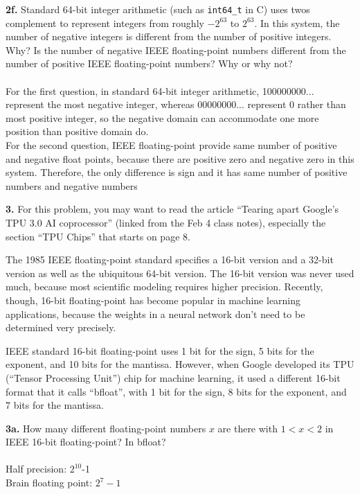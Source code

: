 \documentclass[11pt]{article}
\begin{document}
\par\medskip
{\bf 2f.}
Standard 64-bit integer arithmetic (such as {\tt int64\_t} in C) uses
twos complement to represent integers from roughly $-2^{63}$ to $2^{63}$.
In this system, the number of negative integers is different from the number of
positive integers. Why? Is the number of negative IEEE floating-point numbers
different from the number of positive IEEE floating-point numbers? 
Why or why not?\\\\
For the first question, in standard 64-bit integer arithmetic, 100000000... represent the most negative integer, whereas 00000000... represent 0 rather than most positive integer, so the negative domain can accommodate one more position than positive domain do.\\
For the second question, IEEE floating-point provide same number of positive and negative float points, because there are positive zero and negative zero in this system. Therefore, the only difference is sign and it has same number of positive numbers and negative numbers%
\newpage

\par\bigskip
{\bf 3.}
For this problem, you may want to read the article 
``Tearing apart Google's TPU 3.0 AI coprocessor'' 
(linked from the Feb 4 class notes),
especially the section ``TPU Chips'' that starts on page 8.

The 1985 IEEE floating-point standard specifies a 16-bit version 
and a 32-bit version as well as the ubiquitous 64-bit version.
The 16-bit version was never used much, 
because most scientific modeling requires higher precision. 
Recently, though, 
16-bit floating-point has become popular in machine learning applications,
because the weights in a neural network don't need to be determined very precisely.

IEEE standard 16-bit floating-point uses 1 bit for the sign, 5 bits for 
the exponent, and 10 bits for the mantissa. 
However, when Google developed its TPU (``Tensor Processing Unit'') chip
for machine learning, it used a different 16-bit format that it calls
``bfloat'', with 1 bit for the sign, 8 bits for the exponent, and 7 bits for the mantissa.

\par\medskip
{\bf 3a.}
How many different floating-point numbers $x$ are there with $1 < x < 2$
in IEEE 16-bit floating-point? In bfloat?\\\\
Half precision: $2^{10}$-1\\
Brain floating point: $2^{7}-1$
\end{document}
